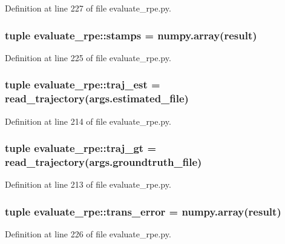 \-Definition at line 227 of file evaluate\-\_\-rpe.\-py.

\subsubsection[{stamps}]{\setlength{\rightskip}{0pt plus 5cm}tuple {\bf evaluate\-\_\-rpe\-::stamps} = numpy.\-array({\bf result})}\label{namespaceevaluate__rpe_ad2a6d660fb1694231301ffcc7fe4001c}


\-Definition at line 225 of file evaluate\-\_\-rpe.\-py.

\subsubsection[{traj\-\_\-est}]{\setlength{\rightskip}{0pt plus 5cm}tuple {\bf evaluate\-\_\-rpe\-::traj\-\_\-est} = {\bf read\-\_\-trajectory}(args.\-estimated\-\_\-file)}\label{namespaceevaluate__rpe_a025671b200f5b7a0983a6514e9361922}


\-Definition at line 214 of file evaluate\-\_\-rpe.\-py.

\subsubsection[{traj\-\_\-gt}]{\setlength{\rightskip}{0pt plus 5cm}tuple {\bf evaluate\-\_\-rpe\-::traj\-\_\-gt} = {\bf read\-\_\-trajectory}(args.\-groundtruth\-\_\-file)}\label{namespaceevaluate__rpe_ac91265aa37e1ddd09b73a62cbd87cff2}


\-Definition at line 213 of file evaluate\-\_\-rpe.\-py.

\subsubsection[{trans\-\_\-error}]{\setlength{\rightskip}{0pt plus 5cm}tuple {\bf evaluate\-\_\-rpe\-::trans\-\_\-error} = numpy.\-array({\bf result})}\label{namespaceevaluate__rpe_a04edc68697ce323bd19a5d3ab23622dd}


\-Definition at line 226 of file evaluate\-\_\-rpe.\-py.

